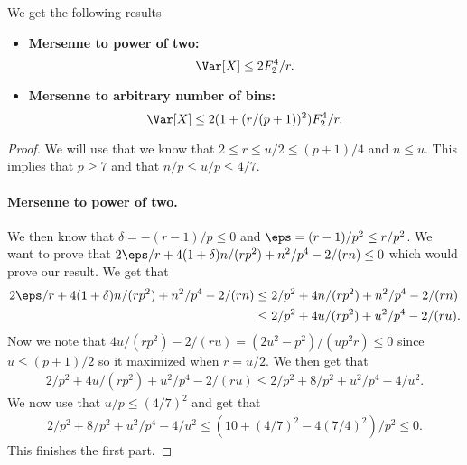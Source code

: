 \begin{corollary}
    We get the following results
    \begin{itemize}
        \item \textbf{Mersenne to power of two:}
            \[
                \Var[X] \le 2 F_2^4/r .
            \]
        \item \textbf{Mersenne to arbitrary number of bins:}
            \[
                \Var[X] \le 2 (1 + (r/(p + 1))^2) F_2^4/r .
            \]
    \end{itemize}
\end{corollary}
\begin{proof}
    We will use that we know that $2 \le r \le u/2 \le (p + 1)/4$ and $n \le u$.
    This implies that $p \ge 7$ and that $n/p \le u/p \le 4/7$.

    \paragraph{Mersenne to power of two.} We then know that $\delta = -(r - 1)/p \le 0$ 
    and $\eps = (r - 1)/p^2 \le r/p^2$. We want to prove that
    $2\eps/r + 4(1 + \delta)n / (rp^2) + n^2/p^4 - 2/(rn) \le 0$ which would
    prove our result. We get that
    \begin{align*}
        2\eps/r + 4(1 + \delta)n / (rp^2) + n^2/p^4 - 2/(rn) 
            &\le 2/p^2 + 4n/(r p^2) + n^2/p^4 - 2/(rn)
            \\&\le 2/p^2 + 4u/(r p^2) + u^2/p^4 - 2/(ru) .
    \end{align*}
    Now we note that $4u/(r p^2) - 2/(ru) = (2u^2 - p^2)/(u p^2 r) \le 0$
    since $u \le (p + 1)/2$ so it maximized when $r = u/2$. We then get
    that
    \begin{align*}
        2/p^2 + 4u/(r p^2) + u^2/p^4 - 2/(ru)
            \le 2/p^2 + 8/p^2 + u^2 / p^4 - 4/u^2 .
    \end{align*}
    We now use that $u/p \le (4/7)^2$ and get that
    \begin{align*}
        2/p^2 + 8/p^2 + u^2 / p^4 - 4/u^2
            \le (10 + (4/7)^2 - 4 (7/4)^2)/p^2
            \le 0 .
    \end{align*}
    This finishes the first part.
    

\end{proof}
